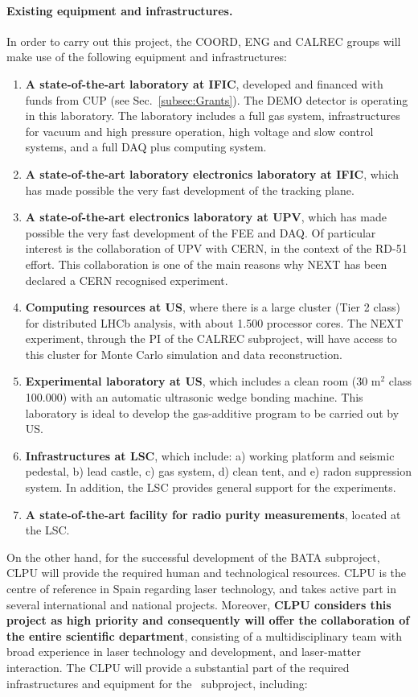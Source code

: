 \paragraph{Existing equipment and infrastructures.}

In order to carry out this project, the COORD, ENG and CALREC groups will make use of the following equipment and infrastructures:

\begin{enumerate}
\item {\bf A state-of-the-art laboratory at IFIC}, developed and financed with funds from CUP (see Sec.~\ref{subsec:Grants}). The DEMO detector is operating in this laboratory. The laboratory includes a full gas system, infrastructures for vacuum and high pressure operation, high voltage and slow control systems, and a full DAQ plus computing system. 
\item {\bf A state-of-the-art laboratory electronics laboratory at IFIC}, which has made possible the very fast development of the tracking plane. 
\item {\bf A state-of-the-art electronics laboratory at UPV}, which has made possible the very fast development of the FEE and DAQ. Of particular interest is the collaboration of UPV with CERN, in the context of the RD-51 effort. This collaboration is one of the main reasons why NEXT has been declared a CERN recognised experiment.
\item {\bf Computing resources at US}, where there is a large cluster (Tier 2 class) for distributed LHCb analysis, with about 1.500 processor cores. The NEXT experiment, through the PI of the CALREC subproject, will have access to this cluster for Monte Carlo simulation and data reconstruction. 
\item {\bf Experimental laboratory at US}, which includes a clean room (30 m$^2$ class 100.000) with an automatic ultrasonic wedge bonding machine. This laboratory is ideal to develop the gas-additive program to be carried out by US. 
\item {\bf Infrastructures at LSC}, which include: a) working platform and seismic pedestal, b) lead castle, c) gas system, d) clean tent, and e) radon suppression system. In addition, the LSC provides general support for the experiments. 
\item {\bf A state-of-the-art facility for radio purity measurements}, located at the LSC. 
\end{enumerate}

On the other hand, for the successful development of the BATA subproject, CLPU will provide the required human and technological resources. CLPU is the centre of reference in Spain regarding laser technology, and takes active part in several international and national projects.  Moreover, {\bf CLPU considers this project as high priority and consequently will offer the collaboration of the entire scientific department}, consisting of a multidisciplinary team with broad experience in laser technology and development, and laser-matter interaction. The CLPU will provide a substantial part of the required infrastructures and equipment for the \BATA\ subproject, including:
 
